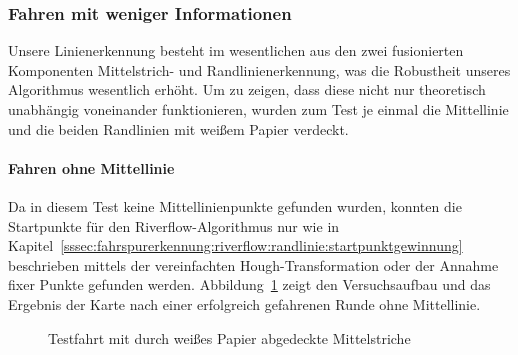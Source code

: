 \subsubsection{Fahren mit weniger Informationen \dcfirstauthorshort}

Unsere Linienerkennung besteht im wesentlichen aus den zwei fusionierten Komponenten Mittelstrich- und Randlinienerkennung, was die Robustheit unseres Algorithmus wesentlich erhöht. Um zu zeigen, dass diese nicht nur theoretisch unabhängig voneinander funktionieren, wurden zum Test je einmal die Mittellinie und die beiden Randlinien mit weißem Papier verdeckt. 


\paragraph{Fahren ohne Mittellinie}
Da in diesem Test keine Mittellinienpunkte gefunden wurden, konnten die Startpunkte für den Riverflow-Algorithmus nur wie in Kapitel~\ref{sssec:fahrspurerkennung:riverflow:randlinie:startpunktgewinnung} beschrieben mittels der vereinfachten Hough-Transformation oder der Annahme fixer Punkte gefunden werden. Abbildung~\ref{fig:evaluation:riverflow:ohneMittellinie} zeigt den Versuchsaufbau und das Ergebnis der Karte nach einer erfolgreich gefahrenen Runde ohne Mittellinie.

\begin{figure}[htbp] %
	\hfill
	\caption{Testfahrt mit durch weißes Papier abgedeckte Mittelstriche}
	\label{fig:evaluation:riverflow:ohneMittellinie}
\end{figure}

